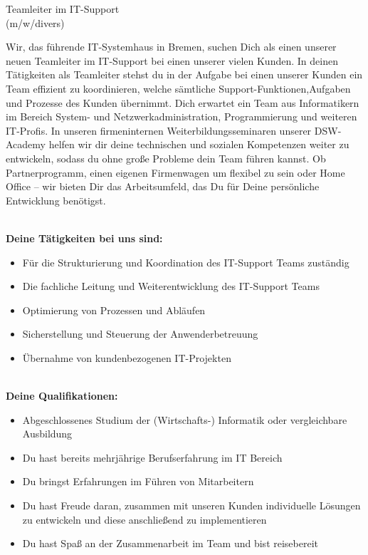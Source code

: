\documentclass[12pt,utf8]{scrartcl}
\begin{document}
\begin{flushleft}
\large
\begin{center} Teamleiter im IT-Support\\(m/w/divers)\end{center} 

\scriptsize
Wir, das führende IT-Systemhaus in Bremen, suchen Dich als einen unserer neuen Teamleiter im IT-Support bei einen unserer vielen Kunden. In deinen Tätigkeiten als Teamleiter stehst du in der Aufgabe bei einen unserer Kunden ein Team effizient zu koordinieren, welche sämtliche Support-Funktionen,Aufgaben und Prozesse des Kunden übernimmt. Dich erwartet ein Team aus Informatikern im Bereich System- und Netzwerkadministration, Programmierung und weiteren IT-Profis. In unseren firmeninternen Weiterbildungsseminaren unserer DSW-Academy helfen wir dir deine technischen und sozialen Kompetenzen weiter zu entwickeln, sodass du ohne große Probleme dein Team führen kannst. Ob Partnerprogramm, einen eigenen Firmenwagen um flexibel zu sein oder Home Office – wir bieten Dir das Arbeitsumfeld, das Du für Deine persönliche Entwicklung benötigst.


\textbf{\\Deine Tätigkeiten bei uns sind:}
\begin{center}
	\begin{itemize}
		\item Für die Strukturierung und Koordination des IT-Support Teams zuständig
		\item Die fachliche Leitung und Weiterentwicklung des IT-Support Teams
		\item Optimierung von Prozessen und Abläufen 
		\item Sicherstellung und Steuerung der Anwenderbetreuung
		\item Übernahme von kundenbezogenen IT-Projekten
	\end{itemize}
\end{center}

\textbf{\\Deine Qualifikationen:}
\begin{center}
	\begin{itemize}
		\item Abgeschlossenes Studium der (Wirtschafts-) Informatik oder vergleichbare Ausbildung
		\item Du hast bereits mehrjährige Berufserfahrung im IT Bereich
		\item Du bringst Erfahrungen im Führen von Mitarbeitern
		\item Du hast Freude daran, zusammen mit unseren Kunden individuelle Lösungen zu entwickeln und diese anschließend zu implementieren
		\item Du hast Spaß an der Zusammenarbeit im Team und bist reisebereit
	\end{itemize}
\end{center}


\end{flushleft}
\end{document}
